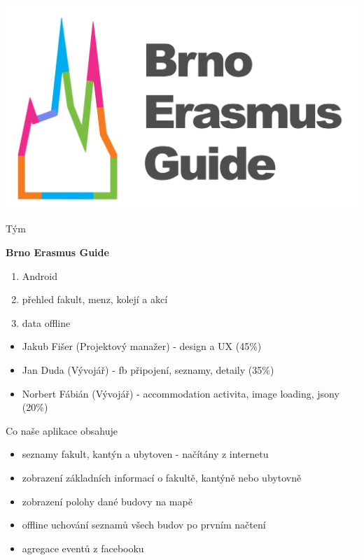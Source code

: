 \documentclass[pdf]{beamer}
\begin{document}
\begin{frame}
  \begin{center}
    \includegraphics[scale=0.13]{app_menu_header}
  \end{center}
\end{frame}

\begin{frame}{Tým}
  \begin{minipage}{\textwidth}
    \textbf{Brno Erasmus Guide}
    \begin{enumerate}
      \item Android    
      \item přehled fakult, menz, kolejí a akcí
      \item data offline
    \end{enumerate}
    \vspace{2\baselineskip}
  \end{minipage}
  \begin{minipage}{\textwidth}
    \begin{itemize}
      \item Jakub Fišer (Projektový manažer) - design a UX (45\%)
      \item Jan Duda (Vývojář) - fb připojení, seznamy, detaily (35\%)
      \item Norbert Fábián (Vývojář) - accommodation activita, image loading, jsony (20\%)
    \end{itemize}  
  \end{minipage}
\end{frame}

\begin{frame}{Co naše aplikace obsahuje}  
 \begin{itemize}
   \item seznamy fakult, kantýn a ubytoven - načítány z internetu
   \item zobrazení základních informací o fakultě, kantýně nebo ubytovně
   \item zobrazení polohy dané budovy na mapě
   \item offline uchování seznamů všech budov po prvním načtení
   \item agregace eventů z facebooku
 \end{itemize}  
\end{frame}
\end{document}
